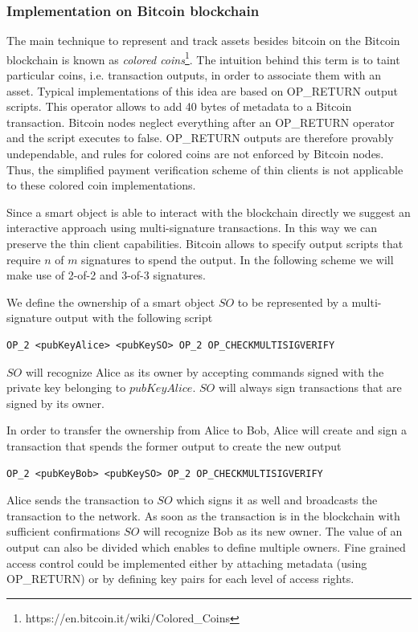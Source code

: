 \documentclass[10pt, conference,compsoc]{IEEEtran}
\begin{document}
\subsubsection{Implementation on Bitcoin blockchain}

The main technique to represent and track assets besides bitcoin on the Bitcoin blockchain is known as \textit{colored coins}\footnote{https://en.bitcoin.it/wiki/Colored\_Coins}. The intuition behind this term is to taint particular coins, i.e. transaction outputs, in order to associate them with an asset. Typical implementations of this idea are based on OP\_RETURN output scripts. This operator allows to add 40 bytes of metadata to a Bitcoin transaction. Bitcoin nodes neglect everything after an OP\_RETURN operator and the script executes to false. OP\_RETURN outputs are therefore provably undependable, and rules for colored coins are not enforced by Bitcoin nodes. Thus, the simplified payment verification scheme of thin clients is not applicable to these colored coin implementations. 

Since a smart object is able to interact with the blockchain directly we suggest an interactive approach using multi-signature transactions. In this way we can preserve the thin client capabilities. Bitcoin allows to specify output scripts that require $n$ of $m$ signatures to spend the output. In the following scheme we will make use of 2-of-2 and 3-of-3 signatures. 

We define the ownership of a smart object $SO$ to be represented by a multi-signature output with the following script

\begin{lstlisting}[breaklines=true]
OP_2 <pubKeyAlice> <pubKeySO> OP_2 OP_CHECKMULTISIGVERIFY
\end{lstlisting}

$SO$ will recognize Alice as its owner by accepting commands signed with the private key belonging to $pubKeyAlice$. $SO$ will always sign transactions that are signed by its owner.

In order to transfer the ownership from Alice to Bob, Alice will create and sign a transaction that spends the former output to create the new output 

\begin{lstlisting}[breaklines=true]
OP_2 <pubKeyBob> <pubKeySO> OP_2 OP_CHECKMULTISIGVERIFY
\end{lstlisting}

Alice sends the transaction to $SO$ which signs it as well and broadcasts the transaction to the network. As soon as the transaction is in the blockchain with sufficient confirmations $SO$ will recognize Bob as its new owner. The value of an output can also be divided which enables to define multiple owners. Fine grained access control could be implemented either by attaching metadata (using OP\_RETURN) or by  defining key pairs for each level of access rights. 
\end{document}

